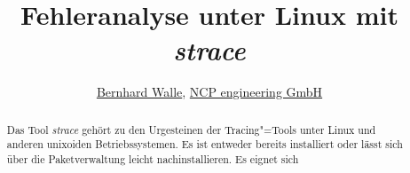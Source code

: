 \documentclass[10pt,DIV=14,twocolumn,ngerman,parskip=half]{scrartcl}
\begin{document}
\title{Fehleranalyse unter Linux mit \emph{strace}}

\author{\href{mailto:bernhard.walle@ncp-e.com}{Bernhard Walle},
        \href{https://www.ncp-e.com}{NCP engineering GmbH}}

\maketitle

\begin{abstract}
    Das Tool \emph{strace} gehört zu den Urgesteinen der Tracing"=Tools unter Linux und anderen
    unixoiden Betriebssystemen. Es ist entweder bereits installiert oder lässt sich über die
    Paketverwaltung leicht nachinstallieren. Es eignet sich 
\end{abstract}



    
\end{document}
